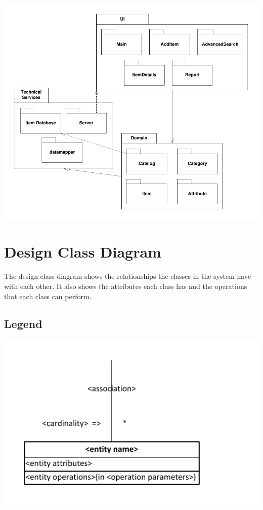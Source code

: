 \documentclass{article}
\begin{document}
\includegraphics[keepaspectratio, width=6in]{package_diagram.pdf}\\

\section{Design Class Diagram}
The design class diagram shows the relationships the classes in the system have with each other.  It also shows the attributes each class has and the operations that each class can perform.

\subsection{Legend}
\includegraphics[keepaspectratio, width=6in]{class_diagram_legend.pdf}\\
\end{document}
